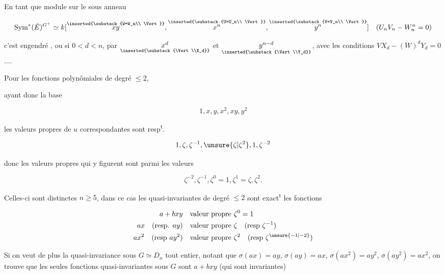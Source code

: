  En tant que module sur le sous anneau

\[\operatorname{Sym}^*(\check E)^{G^+}\simeq k[
\overset{\inserted{\substack{W=W_n\\ \Vert}}}{xy},
\overset{\inserted{\substack{U=U_n\\ \Vert}}}{x^n},
\overset{\inserted{\substack{V=V_n\\ \Vert}}}{y^n}]
\quad(U_{n}V_n-W_n^n=0)\]

c'est engendré  , ou si $0<d<n$, par $\underset{\inserted{\substack{\Vert\\X_d}}}{x^d}$ et $\underset{\inserted{\substack{\Vert\\Y_d}}}{y^{n-d}}$, avec les conditions $VX_d-(W)^dY_d=0$ ....

Pour les fonctions polynômiales de degré $\leq2$,


ayant donc la base

\[1,x,y,x^2,xy,y^2\]

les valeurs propres de $u$ correspondantes sont resp\textsuperscript{t}.

\[1,\zeta,\zeta^{-1},\unsure{\zeta|\zeta^2},1,\zeta^{-2}\]

donc les valeurs propres qui y figurent sont  parmi les  valeurs

\[\zeta^{-2},\zeta^{-1},\zeta^0=1,\zeta^1=\zeta,\zeta^2.\]

Celles-ci sont  distinctes  $n\geq5$, dans ce cas les  quasi-invariantes de degré $\leq2$  sont exact\textsuperscript{t} les fonctions

\[\begin{aligned}
a+bxy&&\text{valeur propre }&\zeta^0=1\\
ax\quad(\text{resp. }ay)&&\text{valeur propre }&\zeta\quad(\text{resp }\zeta^{-1})\\
ax^2\quad(\text{resp }ay^2)&&\text{valeur propre }&\zeta^2\quad(\text{resp }\zeta^{\unsure{-1|-2}})
\end{aligned}\]

Si on veut de plus la quasi-invariance sous $G\simeq D_n$ tout entier,  notant que $\sigma(ax)=ay$, $\sigma(ay)=ax$, $\sigma(ax^2)=ay^{2}$, $\sigma(ay^2)=ax^2$, on trouve que les seules fonctions  quasi-invariantes sous $G$ sont  $a+bxy$ (qui sont  invariantes)


